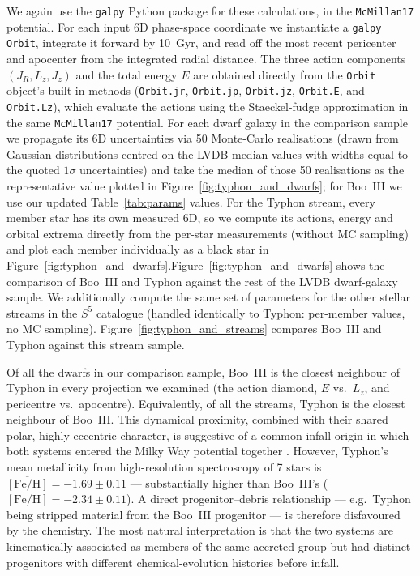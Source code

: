 \documentclass[twocolumn, apj, numberedappendix, appendixfloats]{openjournal_dhayaa}
\newcommand{\SSSSS}{${S}^5$\xspace}
\begin{document}
We again use the \texttt{galpy} Python package for these calculations, in the \texttt{McMillan17} potential. For each input 6D phase-space coordinate we instantiate a \texttt{galpy} \texttt{Orbit}, integrate it forward by 10~Gyr, and read off the most recent pericenter and apocenter from the integrated radial distance. The three action components $(J_R, L_z, J_z)$ and the total energy $E$ are obtained directly from the \texttt{Orbit} object's built-in methods (\texttt{Orbit.jr}, \texttt{Orbit.jp}, \texttt{Orbit.jz}, \texttt{Orbit.E}, and \texttt{Orbit.Lz}), which evaluate the actions using the Staeckel-fudge approximation \citep{Binney2012Staeckel} in the same \texttt{McMillan17} potential. For each dwarf galaxy in the comparison sample we propagate its 6D uncertainties via 50 Monte-Carlo realisations (drawn from Gaussian distributions centred on the LVDB median values with widths equal to the quoted $1\sigma$ uncertainties) and take the median of those 50 realisations as the representative value plotted in Figure~\ref{fig:typhon_and_dwarfs}; for Boo~III we use our updated Table~\ref{tab:params} values. For the Typhon stream, every member star has its own measured 6D, so we compute its actions, energy and orbital extrema directly from the per-star measurements (without MC sampling) and plot each member individually as a black star in Figure~\ref{fig:typhon_and_dwarfs}.Figure~\ref{fig:typhon_and_dwarfs} shows the comparison of Boo~III and Typhon against the rest of the LVDB dwarf-galaxy sample. We additionally compute the same set of parameters for the other stellar streams in the \SSSSS catalogue (handled identically to Typhon: per-member values, no MC sampling). Figure~\ref{fig:typhon_and_streams} compares Boo~III and Typhon against this stream sample.

Of all the dwarfs in our comparison sample, Boo~III is the closest neighbour of Typhon in every projection we examined (the action diamond, $E$ vs.~$L_z$, and pericentre vs.~apocentre). Equivalently, of all the streams, Typhon is the closest neighbour of Boo~III. This dynamical proximity, combined with their shared polar, highly-eccentric character, is suggestive of a common-infall origin in which both systems entered the Milky Way potential together \citep[similar in spirit to other proposed accreted groups, e.g.][]{Ji2023Typhon}. However, Typhon's mean metallicity from high-resolution spectroscopy of 7 stars is $\overline{[\mathrm{Fe/H}]} = -1.69 \pm 0.11$ \citep{Ji2023Typhon} --- substantially higher than Boo~III's ($\overline{[\mathrm{Fe/H}]} = -2.34 \pm 0.11$). A direct progenitor--debris relationship --- e.g.\ Typhon being stripped material from the Boo~III progenitor --- is therefore disfavoured by the chemistry. The most natural interpretation is that the two systems are kinematically associated as members of the same accreted group but had distinct progenitors with different chemical-evolution histories before infall.
\end{document}
